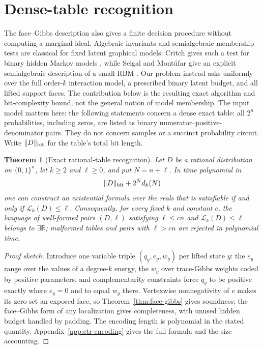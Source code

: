 \documentclass{article}
\newcommand{\LC}{\mathcal{L}}
\newcommand{\bits}{\{0,1\}}
\newtheorem{theorem}{Theorem}
\begin{document}
\section{Dense-table recognition}
\label{sec:recognition}

The face--Gibbs description also gives a finite decision procedure without
computing a marginal ideal.  Algebraic invariants and semialgebraic membership
tests are classical for fixed latent graphical models: Critch gives such a
test for binary hidden Markov models \cite{critch13}, while Seigal and
Mont\'ufar give an explicit semialgebraic description of a small RBM
\cite{seigalmontufar18}.  Our problem instead asks uniformly over the full
order-$k$ interaction model, a prescribed binary latent budget, and all lifted
support faces.  The contribution below is the resulting exact algorithm and
bit-complexity bound, not the general notion of model membership.  The input
model matters here: the following
statements concern a dense exact table: all $2^n$ probabilities, including
zeros, are listed as binary numerator--positive-denominator pairs.  They do
not concern samples or a succinct probability circuit.  Write
$\lVert D\rVert_{\rm bit}$ for the table's total bit length.

\begin{theorem}[Exact rational-table recognition]
\label{thm:etr-recognition}
Let $D$ be a rational distribution on $\bits^n$, let $k\ge2$ and $\ell\ge0$,
and put $N=n+\ell$.  In time polynomial in
\[
  \lVert D\rVert_{\rm bit}+2^N d_k(N)
\]
one can construct an existential formula over the reals that is satisfiable if
and only if $\LC_k(D)\le\ell$.  Consequently, for every fixed $k$ and constant
$c$, the language of well-formed pairs $(D,\ell)$ satisfying
$\ell\le cn$ and $\LC_k(D)\le\ell$ belongs to $\exists\mathbb R$; malformed
tables and pairs with $\ell>cn$ are rejected in polynomial time.
\end{theorem}

\begin{proof}[Proof sketch]
Introduce one variable triple $(q_y,e_y,w_y)$ per lifted state $y$: the
$e_y$ range over the values of a degree-$k$ energy, the $w_y$ over
trace-Gibbs weights coded by positive parameters, and complementarity
constraints force $q_y$ to be positive exactly where $e_y=0$ and to equal
$w_y$ there.  Vertexwise nonnegativity of $e$ makes its zero set an exposed
face, so Theorem~\ref{thm:face-gibbs} gives soundness; the face--Gibbs form
of any localization gives completeness, with unused hidden budget handled by
padding.  The encoding length is polynomial in the stated quantity.
Appendix~\ref{app:etr-encoding} gives the full formula and the size
accounting.
\end{proof}
\end{document}
